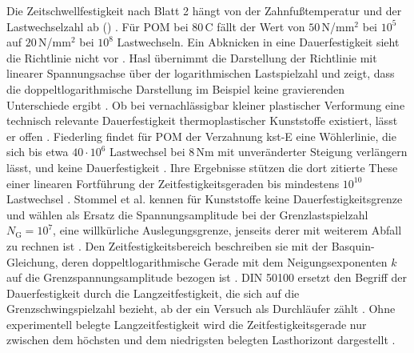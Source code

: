 Die Zeitschwellfestigkeit nach Blatt 2 hängt von der Zahnfußtemperatur und der Lastwechselzahl ab () \cite[Abschnitt~3.2.2, S.~14]{VDI2736-2}. Für POM bei $80$\,\textdegree C fällt der Wert von $50$\,N/mm$^{2}$ bei $10^{5}$ auf $20$\,N/mm$^{2}$ bei $10^{8}$ Lastwechseln. Ein Abknicken in eine Dauerfestigkeit sieht die Richtlinie nicht vor \cite[Tabelle~5, S.~15]{VDI2736-2}. Hasl übernimmt die Darstellung der Richtlinie mit linearer Spannungsachse über der logarithmischen Lastspielzahl und zeigt, dass die doppeltlogarithmische Darstellung im Beispiel keine gravierenden Unterschiede ergibt \cite[S.~107 und 181]{Has18}. Ob bei vernachlässigbar kleiner plastischer Verformung eine technisch relevante Dauerfestigkeit thermoplastischer Kunststoffe existiert, lässt er offen \cite[S.~176]{Has18}. Fiederling findet für POM der Verzahnung kst-E eine Wöhlerlinie, die sich bis etwa $40 \cdot 10^{6}$ Lastwechsel bei $8$\,Nm mit unveränderter Steigung verlängern lässt, und keine Dauerfestigkeit \cite[Abschnitt~6.3.1, S.~82 bis 83]{Fie23}. Ihre Ergebnisse stützen die dort zitierte These einer linearen Fortführung der Zeitfestigkeitsgeraden bis mindestens $10^{10}$ Lastwechsel \cite[S.~83]{Fie23}. Stommel et al. kennen für Kunststoffe keine Dauerfestigkeitsgrenze und wählen als Ersatz die Spannungsamplitude bei der Grenzlastspielzahl $N_{\mathrm{G}} = 10^{7}$, eine willkürliche Auslegungsgrenze, jenseits derer mit weiterem Abfall zu rechnen ist \cite[S.~328]{Sto18}. Den Zeitfestigkeitsbereich beschreiben sie mit der Basquin-Gleichung, deren doppeltlogarithmische Gerade mit dem Neigungsexponenten $k$ auf die Grenzspannungsamplitude bezogen ist \cite[S.~206 bis 207]{Sto18}. DIN 50100 ersetzt den Begriff der Dauerfestigkeit durch die Langzeitfestigkeit, die sich auf die Grenzschwingspielzahl bezieht, ab der ein Versuch als Durchläufer zählt \cite[Abschnitt~5, S.~16]{DIN50100}. Ohne experimentell belegte Langzeitfestigkeit wird die Zeitfestigkeitsgerade nur zwischen dem höchsten und dem niedrigsten belegten Lasthorizont dargestellt \cite[S.~16]{DIN50100}.


